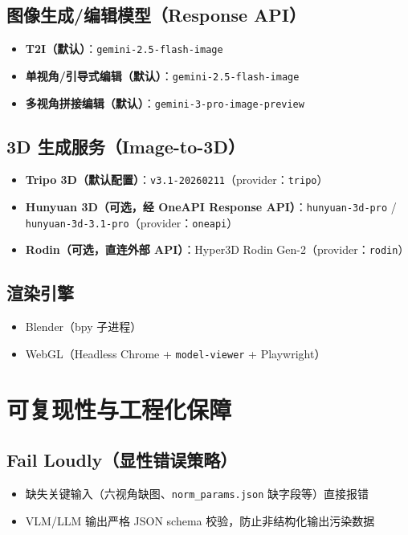 \documentclass[UTF8,a4paper,11pt]{ctexart}
\begin{document}
\subsection{图像生成/编辑模型（Response API）}
\begin{itemize}
  \item \textbf{T2I（默认）}：\texttt{gemini-2.5-flash-image}
  \item \textbf{单视角/引导式编辑（默认）}：\texttt{gemini-2.5-flash-image}
  \item \textbf{多视角拼接编辑（默认）}：\texttt{gemini-3-pro-image-preview}
\end{itemize}

\subsection{3D 生成服务（Image-to-3D）}
\begin{itemize}
  \item \textbf{Tripo 3D（默认配置）}：\texttt{v3.1-20260211}（provider：\texttt{tripo}）
  \item \textbf{Hunyuan 3D（可选，经 OneAPI Response API）}：\texttt{hunyuan-3d-pro} / \texttt{hunyuan-3d-3.1-pro}（provider：\texttt{oneapi}）
  \item \textbf{Rodin（可选，直连外部 API）}：Hyper3D Rodin Gen-2（provider：\texttt{rodin}）
\end{itemize}

\subsection{渲染引擎}
\begin{itemize}
  \item Blender（bpy 子进程）
  \item WebGL（Headless Chrome + \texttt{model-viewer} + Playwright）
\end{itemize}

\section{可复现性与工程化保障}

\subsection{Fail Loudly（显性错误策略）}
\begin{itemize}
  \item 缺失关键输入（六视角缺图、\texttt{norm\_params.json} 缺字段等）直接报错
  \item VLM/LLM 输出严格 JSON schema 校验，防止非结构化输出污染数据
\end{itemize}
\end{document}
